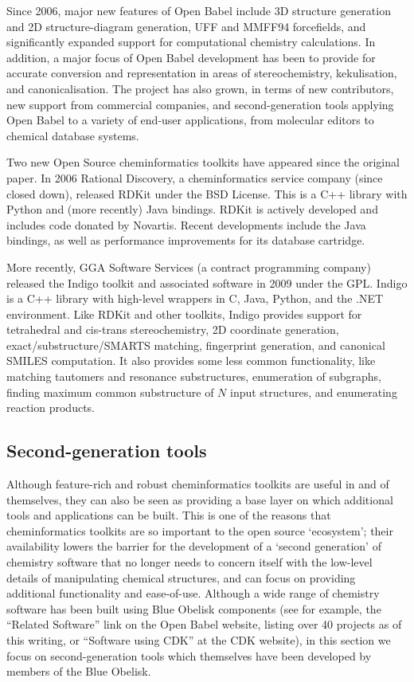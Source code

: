 \documentclass[10pt]{bmc_article}
\newenvironment{bmcformat}{\fussy\setboolean{publ}{true}}{\fussy}
\begin{document}
\begin{bmcformat}
Since 2006, major new features of Open Babel include 3D structure
generation and 2D structure-diagram generation, UFF and MMFF94
forcefields, and significantly expanded support for computational
chemistry calculations. In addition, a major focus of Open Babel development
has been to provide for accurate conversion and representation in
areas of stereochemistry, kekulisation, and canonicalisation. The
project has also grown, in terms of new contributors, new support from
commercial companies, and second-generation tools applying Open Babel
to a variety of end-user applications, from molecular editors to
chemical database systems.

Two new Open Source cheminformatics toolkits have appeared since the
original paper. In 2006 Rational Discovery, a cheminformatics service
company (since closed down), released RDKit \cite{WebRDKit} under the
BSD License. This is a C++ library with Python and (more recently)
Java bindings. RDKit is actively developed and includes
code donated by Novartis. Recent developments include the Java
bindings, as well as performance improvements for its database
cartridge.

More recently, GGA Software Services
(a contract programming company)
released the Indigo toolkit \cite{WebIndigo} and associated software
in 2009 under the GPL. Indigo is a C++ library with
high-level wrappers in C, Java, Python, and the .NET
environment. Like RDKit and other toolkits, Indigo provides support for
tetrahedral and cis-trans stereochemistry, 2D coordinate generation,
exact/substructure/SMARTS matching, fingerprint generation, and
canonical SMILES computation.
It also provides some less common functionality, like matching
tautomers and resonance substructures, enumeration of subgraphs,
finding maximum common substructure of $N$ input structures, and
enumerating reaction products.

\subsection*{Second-generation tools}

Although feature-rich and robust cheminformatics toolkits are useful
in and of themselves, they can also be seen as providing a base layer
on which additional tools and applications can be built. This is one
of the reasons that cheminformatics toolkits are so important to the
open source `ecosystem'; their availability lowers the barrier for the
development of a `second generation' of chemistry software that no
longer needs to concern itself with the low-level details of
manipulating chemical structures, and can focus on providing
additional functionality and ease-of-use. Although a wide range of
chemistry software has been built using Blue Obelisk
components (see for example, the ``Related Software'' link on the Open
Babel website,\cite{WebOBRelated} listing over 40 projects as of this writing, 
or ``Software using CDK'' at the CDK website), in this
section we focus on second-generation tools which themselves have been
developed by members of the Blue Obelisk. 


\end{bmcformat}
\end{document}
